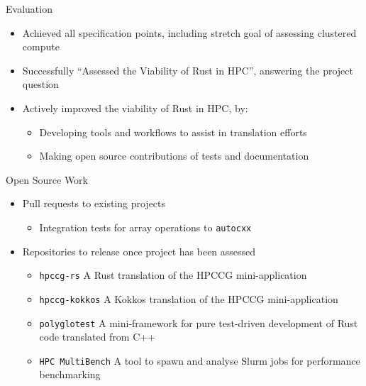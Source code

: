 \documentclass[10pt,aspectratio=169]{beamer}
\begin{document}
\begin{frame}{Evaluation}
    \begin{itemize}
        \item Achieved all specification points, including stretch goal of assessing clustered compute
        \item Successfully ``Assessed the Viability of Rust in HPC'', answering the project question
        \vspace{0.5cm}
        \item \alert{Actively improved} the viability of Rust in HPC, by:
        \begin{itemize}
            \item Developing tools and workflows to assist in translation efforts
            \item Making open source contributions of tests and documentation
        \end{itemize}
    \end{itemize}
\end{frame}


\begin{frame}{Open Source Work}
    \begin{itemize}
        \item Pull requests to existing projects
        \begin{itemize}
            \item Integration tests for array operations to \texttt{autocxx}
        \end{itemize}
        \item Repositories to release once project has been assessed
        \begin{itemize}
            \item \texttt{hpccg-rs} A Rust translation of the HPCCG mini-application
            \item \texttt{hpccg-kokkos} A Kokkos translation of the HPCCG mini-application
            \item \texttt{polyglotest} A mini-framework for pure test-driven development of Rust code translated from C++
            \item \texttt{HPC MultiBench} A tool to spawn and analyse Slurm jobs for performance benchmarking
        \end{itemize}
    \end{itemize}
\end{frame}
\end{document}
